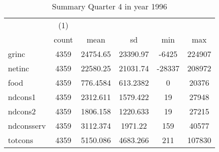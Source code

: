\begin{table}[htbp]\centering
\def\sym#1{\ifmmode^{#1}\else\(^{#1}\)\fi}
\caption{Summary Quarter 4 in year 1996 \label{sum\_Q4\_y1996}}
\begin{tabular}{l*{1}{ccccc}}
\hline\hline
            &\multicolumn{1}{c}{(1)}&            &            &            &            \\
            &       count&        mean&          sd&         min&         max\\
\hline
grinc       &        4359&    24754.65&    23390.97&       -6425&      224907\\
netinc      &        4359&    22580.25&    21031.74&      -28337&      208972\\
food        &        4359&    776.4584&    613.2382&           0&       20376\\
ndcons1     &        4359&    2312.611&    1579.422&          19&       27948\\
ndcons2     &        4359&    1806.158&    1220.633&          19&       27215\\
ndconsserv  &        4359&    3112.374&     1971.22&         159&       40577\\
totcons     &        4359&    5150.086&    4683.266&         211&      107830\\
\hline\hline
\end{tabular}
\end{table}
